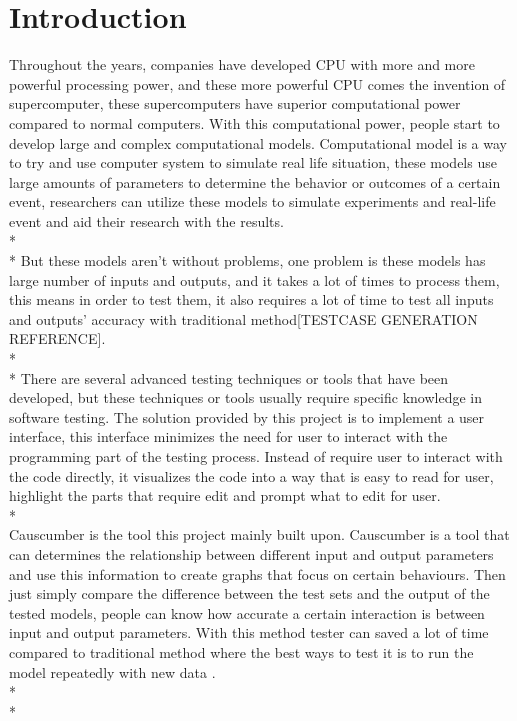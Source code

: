 \chapter{Introduction}

Throughout the years, companies have developed CPU with more and more powerful processing power, and these more powerful CPU comes the invention of supercomputer, these supercomputers have superior computational power compared to normal computers. With this computational power, people start to develop large and complex computational models. Computational model is a way to try and use computer system to simulate real life situation, these models use large amounts of parameters to determine the behavior or outcomes of a certain event, researchers can utilize these models to simulate experiments and real-life event \cite{Reference1} and aid their research with the results.\\*\\*
But these models aren’t without problems, one problem is these models has large number of inputs and outputs, and it takes a lot of times to process them, this means in order to test them, it also requires a lot of time to test all inputs and outputs’ accuracy with traditional method[TESTCASE GENERATION REFERENCE]. \\*\\*
There are several advanced testing techniques or tools that have been developed, but these techniques or tools usually require specific knowledge in software testing. The solution provided by this project is to implement a user interface, this interface minimizes the need for user to interact with the programming part of the testing process. Instead of require user to interact with the code directly, it visualizes the code into a way that is easy to read for user, highlight the parts that require edit and prompt what to edit for user.\\*\\
Causcumber is the tool this project mainly built upon. Causcumber is a tool that can determines the relationship between different input and output parameters and use this information to create graphs that focus on certain behaviours. Then just simply compare the difference between the test sets and the output of the tested models, people can know how accurate a certain interaction is between input and output parameters. With this method tester can saved a lot of time compared to traditional method where the best ways to test it is to run the model repeatedly with new data \cite{Reference2}. \\*\\*

